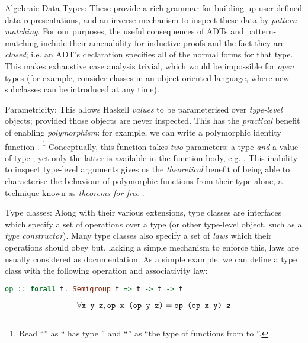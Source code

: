\begin{description}
\item{Algebraic Data Types}: These provide a rich grammar for building up user-defined data representations, and an inverse mechanism to inspect these data by \emph{pattern-matching}. For our purposes, the useful consequences of ADTs and pattern-matching include their amenability for inductive proofs and the fact they are \emph{closed}; i.e. an ADT's declaration specifies all of the normal forms for that type. This makes exhaustive case analysis trivial, which would be impossible for \emph{open} types (for example, consider classes in an object oriented language, where new subclasses can be introduced at any time).

\item{Parametricity}: This allows Haskell \emph{values} to be parameterised over \emph{type-level} objects; provided those objects are never inspected. This has the \emph{practical} benefit of enabling \emph{polymorphism}: for example, we can write a polymorphic identity function . \footnote{Read ``'' as `` has type '' and ``'' as ``the type of functions from  to ''.} Conceptually, this function takes \emph{two} parameters: a type  \emph{and} a value of type ; yet only the latter is available in the function body, e.g. . This inability to inspect type-level arguments gives us the \emph{theoretical} benefit of being able to characterise the behaviour of polymorphic functions from their type alone, a technique known as \emph{theorems for free} \citep{wadler1989theorems}.

\item{Type classes}: Along with their various extensions, type classes are interfaces which specify a set of operations over a type (or other type-level object, such as a \emph{type constructor}). Many type classes also specify a set of \emph{laws} which their operations should obey but, lacking a simple mechanism to enforce this, laws are usually considered as documentation. As a simple example, we can define a type class  with the following operation and associativity law:

\begin{lstlisting}[language=Haskell, xleftmargin=.2\textwidth, xrightmargin=.2\textwidth]
op :: forall t. Semigroup t => t -> t -> t
\end{lstlisting}

$$\forall \text{\texttt{x y z}}, \text{\texttt{op x (op y z)}} = \text{\texttt{op (op x y) z}}$$


\end{description}
